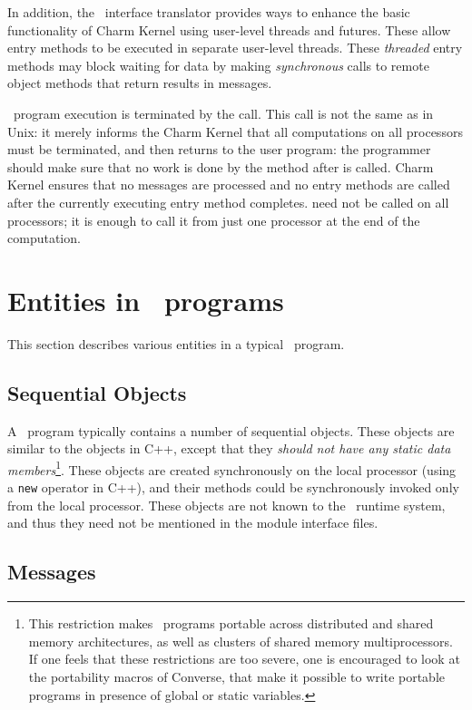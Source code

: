 In addition, the \charmpp\ interface translator provides ways to enhance the
basic functionality of Charm Kernel using user-level threads and futures. These
allow entry methods to be executed in separate user-level threads.  These
 {\em threaded} entry methods may block waiting for data by
making {\em synchronous} calls to remote object methods that return results in
messages.

\charmpp\ program execution is terminated by the 
 call. This call is not the same as in Unix:
it merely informs the Charm Kernel that all computations on all processors must
be terminated, and then returns to the user program: the programmer should make
sure that no work is done by the method after  is called.
Charm Kernel ensures that no messages are processed and no entry methods are
called after the currently executing entry method completes. 
need not be called on all processors; it is enough to call it from just one
processor at the end of the computation.

\section{Entities in \charmpp\ programs}

This section describes various entities in a typical \charmpp\ program.

\subsection{Sequential Objects}

A \charmpp\ program typically contains a number of sequential objects. These
objects are similar to the objects in C++, except that they {\em should not
have any static data members}\footnote{ This restriction makes \charmpp\
programs portable across distributed and shared memory architectures, as well
as clusters of shared memory multiprocessors. If one feels that these
restrictions are too severe, one is encouraged to look at the portability
macros of Converse, that make it possible to write portable programs in
presence of global or static variables.  }. These objects are created
synchronously on the local processor (using a {\tt new} operator in C++), and
their methods could be synchronously invoked only from the local processor.
These objects are not known to the \charmpp\ runtime system, and
thus they need not be mentioned in the module interface files.

\subsection{Messages}

